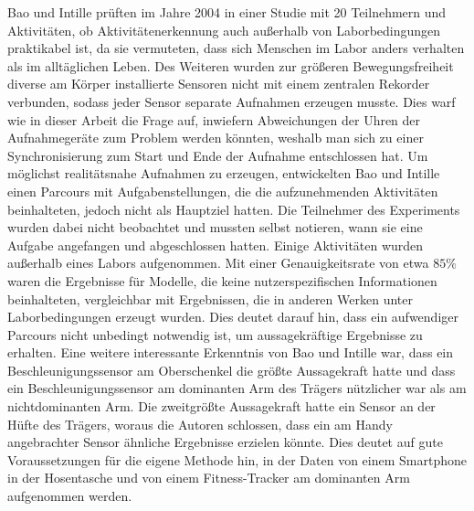 Bao und Intille prüften im Jahre 2004 in einer Studie mit 20 Teilnehmern und Aktivitäten, ob Aktivitätenerkennung auch außerhalb von Laborbedingungen praktikabel ist, da sie vermuteten, dass sich Menschen im Labor anders verhalten als im alltäglichen Leben. Des Weiteren wurden zur größeren Bewegungsfreiheit diverse am Körper installierte Sensoren nicht mit einem zentralen Rekorder verbunden, sodass jeder Sensor separate Aufnahmen erzeugen musste. Dies warf wie in dieser Arbeit die Frage auf, inwiefern Abweichungen der Uhren der Aufnahmegeräte zum Problem werden könnten, weshalb man sich zu einer Synchronisierung zum Start und Ende der Aufnahme entschlossen hat.
Um möglichst realitätsnahe Aufnahmen zu erzeugen, entwickelten Bao und Intille einen Parcours mit Aufgabenstellungen, die die aufzunehmenden Aktivitäten beinhalteten, jedoch nicht als Hauptziel hatten. Die Teilnehmer des Experiments wurden dabei nicht beobachtet und mussten selbst notieren, wann sie eine Aufgabe angefangen und abgeschlossen hatten. Einige Aktivitäten wurden außerhalb eines Labors aufgenommen. Mit einer Genauigkeitsrate von etwa $85 \%$ waren die Ergebnisse für Modelle, die keine nutzerspezifischen Informationen beinhalteten, vergleichbar mit Ergebnissen, die in anderen Werken unter Laborbedingungen erzeugt wurden. Dies deutet darauf hin, dass ein aufwendiger Parcours nicht unbedingt notwendig ist, um aussagekräftige Ergebnisse zu erhalten.
Eine weitere interessante Erkenntnis von Bao und Intille war, dass ein Beschleunigungssensor am Oberschenkel die größte Aussagekraft hatte und dass ein Beschleunigungssensor am dominanten Arm des Trägers nützlicher war als am nichtdominanten Arm. Die zweitgrößte Aussagekraft hatte ein Sensor an der Hüfte des Trägers, woraus die Autoren schlossen, dass ein am Handy angebrachter Sensor ähnliche Ergebnisse erzielen könnte. Dies deutet auf gute Voraussetzungen für die eigene Methode hin, in der Daten von einem Smartphone in der Hosentasche und von einem Fitness-Tracker am dominanten Arm aufgenommen werden.


